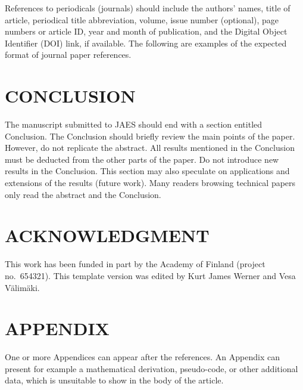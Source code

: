 \documentclass[fleqn]{jaes}
\begin{document}
References to periodicals (journals) should include the authors’ names, title of article, periodical title abbreviation, volume, issue number (optional), page numbers or article ID, year and month of publication, and the Digital Object Identifier (DOI) link, if available. The following are examples of the expected format of journal paper references.

\section{CONCLUSION}
The manuscript submitted to JAES should end with a section entitled Conclusion. The Conclusion should briefly review the main points of the paper. However, do not replicate the abstract. All results mentioned in the Conclusion must be deducted from the other parts of the paper. Do not introduce new results in the Conclusion. This section may also speculate on applications and extensions of the results (future work). Many readers browsing technical papers only read the abstract and the Conclusion.

\section{ACKNOWLEDGMENT}
This  work  has  been  funded  in  part  by  the  Academy of   Finland   (project no.~654321). This template version was edited by Kurt James Werner and Vesa V\"alim\"aki. 

\appendix

\section*{APPENDIX}
One or more Appendices can appear after the references. An Appendix can present for example a mathematical derivation, pseudo-code, or other additional data, which is unsuitable to show in the body of the article.

 
\end{document}
